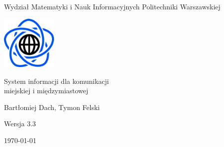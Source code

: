 \documentclass[10pt,a4paper]{article}
\begin{document}
\begin{titlepage}
	\centering
	{\Large Wydział Matematyki i Nauk Informacyjnych Politechniki Warszawskiej \par}
	\vspace{1cm}
	\includegraphics[width=0.2\textwidth]{Resources/Images/logo.png} \par
	\vspace{5cm}
	{\LARGE System informacji dla komunikacji \\ miejskiej i międzymiastowej \par}
	\vspace{0.5cm}
	{\Large Bartłomiej Dach, Tymon Felski \par}
	\vspace{1.5cm}
	{\Large Wersja 3.3 \par}
	\vspace{1.5cm}
	{\Large \today \par}
\end{titlepage}
\end{document}

